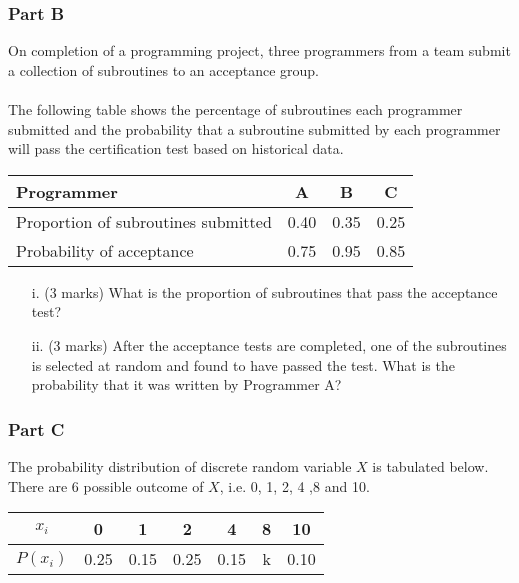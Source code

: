 \documentclass[a4paper,12pt]{article}
\begin{document}
\subsubsection*{Part B}
On completion of a programming project, three programmers from a team submit a collection of subroutines to an acceptance group. \\
    \\
    The following table shows the percentage of subroutines each programmer submitted and the probability that a subroutine submitted by each programmer will pass the certification test based on historical data.

\begin{center}
\begin{tabular}{|l|c|c|c|}
  \hline
Programmer &	A	&B	& C	\\\hline
Proportion of subroutines submitted&	0.40	&0.35	&0.25	\\ \hline
Probability of acceptance	&0.75	&0.95	&0.85\\

  \hline
\end{tabular}
\end{center}

\begin{itemize}
\item[i.] (3 marks) What is the proportion of subroutines that pass the acceptance test?
\item[ii.](3 marks)  After the acceptance tests are completed, one of the subroutines is selected at random and found to have passed the test. What is the probability that it was written by Programmer A?
\end{itemize}


\subsubsection*{Part C}
 The probability distribution of discrete random variable $X$ is tabulated below. There are 6 possible outcome of $X$, i.e. 0, 1, 2, 4 ,8 and 10.
\begin{center}
\begin{tabular}{|c||c|c|c|c|c|c|}
\hline
$x_i$  & 0 & 1 & 2 & 4 & 8 & 10 \\\hline
$P(x_i)$ & 0.25 & 0.15 & 0.25 & 0.15 & k & 0.10\\
\hline
\end{tabular}
\end{center}
\end{document}
